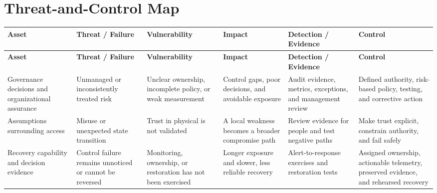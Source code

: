 \documentclass[11pt,letterpaper]{article}
\begin{document}
\section*{Threat-and-Control Map}
\begingroup\scriptsize\setlength{\tabcolsep}{2pt}
\begin{longtable}{>{\raggedright\arraybackslash}p{}>{\raggedright\arraybackslash}p{}>{\raggedright\arraybackslash}p{}>{\raggedright\arraybackslash}p{}>{\raggedright\arraybackslash}p{}>{\raggedright\arraybackslash}p{}}
\toprule\rowcolor{Navy}\color{white}\textbf{Asset} & \color{white}\textbf{Threat / Failure} & \color{white}\textbf{Vulnerability} & \color{white}\textbf{Impact} & \color{white}\textbf{Detection / Evidence} & \color{white}\textbf{Control}\\\midrule
\endfirsthead
\toprule\rowcolor{Navy}\color{white}\textbf{Asset} & \color{white}\textbf{Threat / Failure} & \color{white}\textbf{Vulnerability} & \color{white}\textbf{Impact} & \color{white}\textbf{Detection / Evidence} & \color{white}\textbf{Control}\\\midrule
\endhead
Governance decisions and organizational assurance & Unmanaged or inconsistently treated risk & Unclear ownership, incomplete policy, or weak measurement & Control gaps, poor decisions, and avoidable exposure & Audit evidence, metrics, exceptions, and management review & Defined authority, risk-based policy, testing, and corrective action\\\midrule
Assumptions surrounding access & Misuse or unexpected state transition & Trust in physical is not validated & A local weakness becomes a broader compromise path & Review evidence for people and test negative paths & Make trust explicit, constrain authority, and fail safely\\\midrule
Recovery capability and decision evidence & Control failure remains unnoticed or cannot be reversed & Monitoring, ownership, or restoration has not been exercised & Longer exposure and slower, less reliable recovery & Alert-to-response exercises and restoration tests & Assigned ownership, actionable telemetry, preserved evidence, and rehearsed recovery\\\midrule
\bottomrule
\end{longtable}
\endgroup
\end{document}
